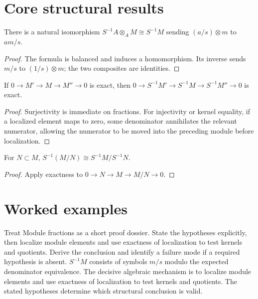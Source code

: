 \section{Core structural results}

\begin{theorem}\label{thm:v07-01}
There is a natural isomorphism $S^{-1}A\otimes_A M\cong S^{-1}M$ sending $(a/s)\otimes m$ to $am/s$.
\begin{proof}
The formula is balanced and induces a homomorphism. Its inverse sends $m/s$ to $(1/s)\otimes m$; the two composites are identities.
\end{proof}
\end{theorem}

\begin{theorem}\label{thm:v07-02}
If $0\to M'\to M\to M''\to0$ is exact, then $0\to S^{-1}M'\to S^{-1}M\to S^{-1}M''\to0$ is exact.
\begin{proof}
Surjectivity is immediate on fractions. For injectivity or kernel equality, if a localized element maps to zero, some denominator annihilates the relevant numerator, allowing the numerator to be moved into the preceding module before localization.
\end{proof}
\end{theorem}

\begin{theorem}\label{thm:v07-03}
For $N\subset M$, $S^{-1}(M/N)\cong S^{-1}M/S^{-1}N$.
\begin{proof}
Apply exactness to $0\to N\to M\to M/N\to0$.
\end{proof}
\end{theorem}

\section{Worked examples}

\begin{example}\label{ex:v07-worked-01}
Treat Module fractions as a short proof dossier. State the hypotheses explicitly, then localize module elements and use exactness of localization to test kernels and quotients. Derive the conclusion and identify a failure mode if a required hypothesis is absent. $S^{-1}M$ consists of symbols $m/s$ modulo the expected denominator equivalence. The decisive algebraic mechanism is to localize module elements and use exactness of localization to test kernels and quotients. The stated hypotheses determine which structural conclusion is valid.
\end{example}


